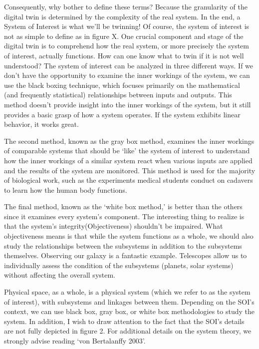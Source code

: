 \documentclass[9pt,conference]{IEEEtran}
\begin{document}
    Consequently, why bother to define these terms? Because the granularity of the digital twin is determined by the complexity of the real system. 
    In the end, a System of Interest is what we'll be twinning! Of course, the system of interest is not as simple to define as in figure X. 
    One crucial component and stage of the digital twin is to comprehend how the real system, or more precisely the system of interest, 
    actually functions. How can one know what to twin if it is not well understood?
    The system of interest can be analyzed in three different ways. If we don't have the opportunity to examine the inner workings of the system, 
    we can use the black boxing technique, which focuses primarily on the mathematical (and frequently statistical) 
    relationships between inputs and outputs. This method doesn't provide insight into the inner workings of the system, but it still provides 
    a basic grasp of how a system operates. If the system exhibits linear behavior, it works great.

    The second method, known as the gray box method, examines the inner workings of comparable systems that should be `like' 
    the system of interest to understand how the inner workings of a similar system react when various inputs are applied and the results of the system are monitored. 
    This method is used for the majority of biological work, such as the experiments medical students conduct on cadavers to learn how the human body functions. 
    
    The final method, known as the `white box method,' is better than the others since it examines every system's component. 
    The interesting thing to realize is that the system's integrity(Objectiveness) shouldn't be impaired.
    What objectiveness means is that while the system functions as a whole, we should also study the relationships 
    between the subsystems in addition to the subsystems themselves. 
    Observing our galaxy is a fantastic example. Telescopes allow us to individually assess the condition of the subsystems (planets, solar systems) 
    without affecting the overall system.

    Physical space, as a whole, is a physical system (which we refer to as the system of interest),
    with subsystems and linkages between them. Depending on the SOI's context, we can use black box, gray box, or white box methodologies to study the system.
    In addition, I wish to draw attention to the fact that the SOI's details are not fully depicted in figure 2. 
    For additional details on the system theory, we strongly advise reading `von Bertalanffy 2003'.
\end{document}
